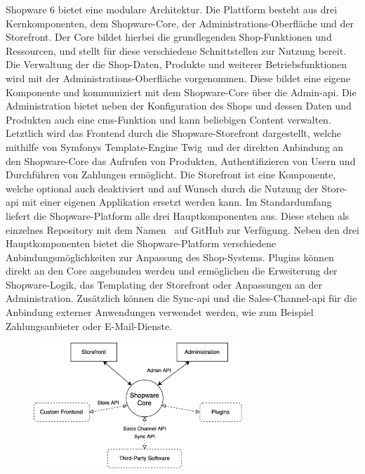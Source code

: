 Shopware 6 bietet eine modulare Architektur.
Die Plattform besteht aus drei Kernkomponenten, dem Shopware-Core, der Administrations-Oberfläche und der Storefront.
Der Core bildet hierbei die grundlegenden Shop-Funktionen und Ressourcen, und stellt für diese verschiedene
Schnittstellen zur Nutzung bereit.
Die Verwaltung der die Shop-Daten, Produkte und weiterer Betriebsfunktionen wird mit der Administrations-Oberfläche
vorgenommen.
Diese bildet eine eigene Komponente und kommuniziert mit dem Shopware-Core über die Admin-\acrshort{api}.
Die Administration bietet neben der Konfiguration des Shops und dessen Daten und Produkten auch eine
\acrshort{cms}-Funktion und kann beliebigen Content verwalten.
Letztlich wird das Frontend durch die Shopware-Storefront dargestellt, welche mithilfe von Symfonys Template-Engine
\glqq Twig\grqq\ und der direkten Anbindung an den Shopware-Core das Aufrufen von Produkten, Authentifizieren von Usern
und Durchführen von Zahlungen ermöglicht.
Die Storefront ist eine Komponente, welche optional auch deaktiviert und auf Wunsch durch die
Nutzung der Store-\acrshort{api} mit einer eigenen Applikation ersetzt werden kann.
Im Standardumfang liefert die Shopware-Platform alle drei Hauptkomponenten aus.
Diese stehen als einzelnes Repository mit dem Namen\  auf GitHub zur Verfügung.
Neben den drei Hauptkomponenten bietet die Shopware-Platform verschiedene Anbindungsmöglichkeiten zur Anpassung des
Shop-Systems.
Plugins können direkt an den Core angebunden werden und ermöglichen die Erweiterung der Shopware-Logik, das Templating
der Storefront oder Anpassungen an der Administration.
Zusätzlich können die Sync-\acrshort{api} und die Sales-Channel-\acrshort{api} für die Anbindung externer Anwendungen
verwendet werden, wie zum Beispiel Zahlungsanbieter oder E-Mail-Dienste.

\begin{figure}[H]
    \centering
    \includegraphics[width=0.7\textwidth]{images/content/shopware-architecture}
    \label{fig:shopware-architecture}
\end{figure}

